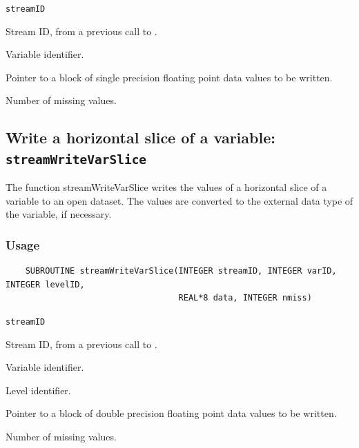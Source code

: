 \hspace*{4mm}\begin{minipage}[]{15cm}
\begin{deflist}{\tt streamID\ }
\item[{\tt streamID}]
Stream ID, from a previous call to {}.
\item[{\tt varID}]
Variable identifier.
\item[{\tt data}]
Pointer to a block of single precision floating point data values to be written.
\item[{\tt nmiss}]
Number of missing values.

\end{deflist}
\end{minipage}


\subsection{Write a horizontal slice of a variable: {\tt streamWriteVarSlice}}
\label{streamWriteVarSlice}

The function streamWriteVarSlice writes the values of a horizontal slice of a variable to an open dataset.
The values are converted to the external data type of the variable, if necessary.
\subsubsection*{Usage}

\begin{verbatim}
    SUBROUTINE streamWriteVarSlice(INTEGER streamID, INTEGER varID, INTEGER levelID, 
                                   REAL*8 data, INTEGER nmiss)
\end{verbatim}

\hspace*{4mm}\begin{minipage}[]{15cm}
\begin{deflist}{\tt streamID\ }
\item[{\tt streamID}]
Stream ID, from a previous call to {}.
\item[{\tt varID}]
Variable identifier.
\item[{\tt levelID}]
Level identifier.
\item[{\tt data}]
Pointer to a block of double precision floating point data values to be written.
\item[{\tt nmiss}]
Number of missing values.

\end{deflist}
\end{minipage}


